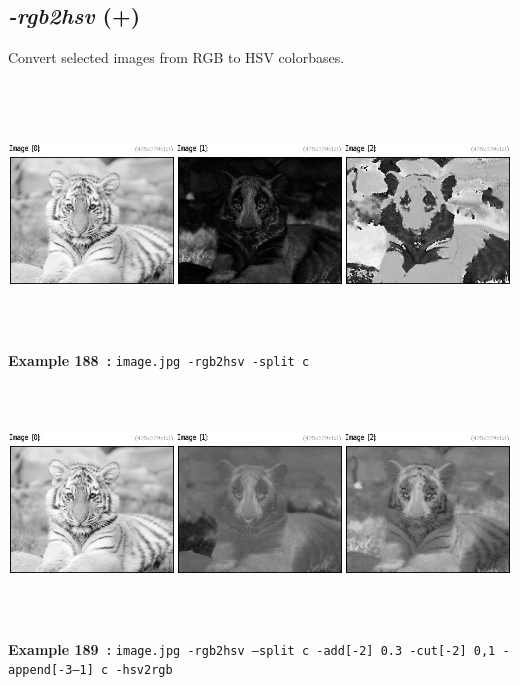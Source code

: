 \documentclass[a4paper,11pt,twoside]{book}
\begin{document}
\subsection{\emph{-rgb2hsv} (+)}\vspace*{-0.5em}
Convert selected images from RGB to HSV colorbases.
\begin{center}\includegraphics[keepaspectratio=true,height=7cm,width=\textwidth]{img/gmic_def188.jpg}\\
{\footnotesize \textbf{Example 188~:} \texttt{image.jpg -rgb2hsv -split c}}
\\\includegraphics[keepaspectratio=true,height=7cm,width=\textwidth]{img/gmic_def189.jpg}\\
{\footnotesize \textbf{Example 189~:} \texttt{image.jpg -rgb2hsv --split c -add[-2] 0.3 -cut[-2] 0,1 -append[-3--1] c -hsv2rgb}}
\end{center}
\end{document}
